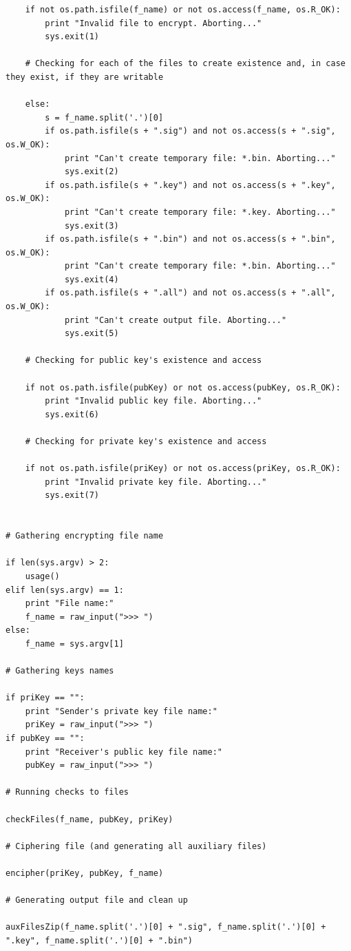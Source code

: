 \documentclass[a4paper,11pt,openright,oneside]{report}
\begin{document}
\begin{verbatim}
    if not os.path.isfile(f_name) or not os.access(f_name, os.R_OK):
        print "Invalid file to encrypt. Aborting..."
        sys.exit(1)

    # Checking for each of the files to create existence and, in case they exist, if they are writable

    else:
        s = f_name.split('.')[0]
        if os.path.isfile(s + ".sig") and not os.access(s + ".sig", os.W_OK):
            print "Can't create temporary file: *.bin. Aborting..."
            sys.exit(2)
        if os.path.isfile(s + ".key") and not os.access(s + ".key", os.W_OK):
            print "Can't create temporary file: *.key. Aborting..."
            sys.exit(3)
        if os.path.isfile(s + ".bin") and not os.access(s + ".bin", os.W_OK):
            print "Can't create temporary file: *.bin. Aborting..."
            sys.exit(4)
        if os.path.isfile(s + ".all") and not os.access(s + ".all", os.W_OK):
            print "Can't create output file. Aborting..."
            sys.exit(5)

    # Checking for public key's existence and access

    if not os.path.isfile(pubKey) or not os.access(pubKey, os.R_OK):
        print "Invalid public key file. Aborting..."
        sys.exit(6)

    # Checking for private key's existence and access

    if not os.path.isfile(priKey) or not os.access(priKey, os.R_OK):
        print "Invalid private key file. Aborting..."
        sys.exit(7)


# Gathering encrypting file name

if len(sys.argv) > 2:
    usage()
elif len(sys.argv) == 1:
    print "File name:"
    f_name = raw_input(">>> ")
else:
    f_name = sys.argv[1]

# Gathering keys names

if priKey == "":
    print "Sender's private key file name:"
    priKey = raw_input(">>> ")
if pubKey == "":
    print "Receiver's public key file name:"
    pubKey = raw_input(">>> ")

# Running checks to files

checkFiles(f_name, pubKey, priKey)

# Ciphering file (and generating all auxiliary files)

encipher(priKey, pubKey, f_name)

# Generating output file and clean up

auxFilesZip(f_name.split('.')[0] + ".sig", f_name.split('.')[0] + ".key", f_name.split('.')[0] + ".bin")
\end{verbatim}
\end{document}
